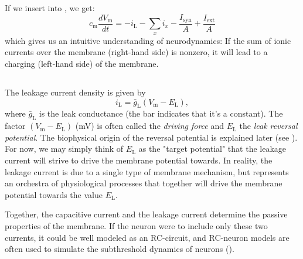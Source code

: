 If we insert  into , we get:
\begin{equation}
c_{\mathrm{m}} \frac{dV_\mathrm{m}}{dt} = -  i_{\mathrm{L}} - \sum_x{i_x} - \frac{I_{\mathrm{syn}}}{A} + \frac{I_{\mathrm{ext}}}{A}
\label{eq:Neuron:singlecomp_capinserted}
\end{equation}
which gives us an intuitive understanding of neurodynamics: If the sum of ionic currents over the membrane (right-hand side) is nonzero, it will lead to a charging (left-hand side) of the membrane.


\subsection{}
\label{sec:Neuron:leak}
The leakage current density is given by
\begin{equation}
i_{\mathrm{L}} = \bar{g}_{\mathrm{L}} (V_\mathrm{m} - E_{\mathrm{L}}),
\label{eq:Neuron:HHleak}
\end{equation}
where $\bar{g}_{\mathrm{L}}$ is the leak conductance (the bar indicates that it's a constant). The factor $(V_\mathrm{m} - E_{\mathrm{L}})$ (\si{\milli\volt}) is often called the \textit{driving force} and $E_{\mathrm{L}}$ the \textit{leak reversal potential}. The biophysical origin of the reversal potential is explained later (see ). For now, we may simply think of $E_{\mathrm{L}}$ as the "target potential" that the leakage current will strive to drive the membrane potential towards. In reality, the leakage current is  due to a single type of membrane mechanism, but represents an orchestra of physiological processes that together will drive the membrane potential towards the value $E_{\mathrm{L}}$. 

Together, the capacitive current and the leakage current determine the passive properties of the membrane. If the neuron were to include only these two currents, it could be well modeled as an RC-circuit, and RC-neuron models are often used to simulate the subthreshold dynamics of neurons (). 

